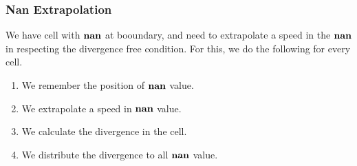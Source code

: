 \subsubsection{Nan Extrapolation}

We have cell with $\mathop{\textbf{nan}}$ at booundary, and need to extrapolate a speed in the $\mathop{\textbf{nan}}$ in respecting the divergence free condition.
For this, we do the following for every cell.
\begin{enumerate}
\item We remember the position of $\mathop{\textbf{nan}}$ value.
\item We extrapolate a speed in $\mathop{\textbf{nan}}$ value.
\item We calculate the divergence in the cell.
\item We distribute the divergence to all $\mathop{\textbf{nan}}$ value.
\end{enumerate}

